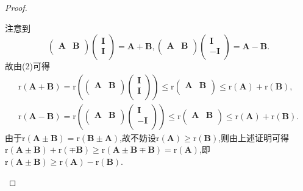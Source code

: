 \documentclass[../../main.tex]{subfiles}%
\begin{document}
\begin{proof}
\begin{enumerate}[(1)]
注意到
\[
\left( \begin{matrix}
\boldsymbol{A}&		\boldsymbol{B}\\
\end{matrix} \right) \left( \begin{array}{c}
\boldsymbol{I}\\
\boldsymbol{I}\\
\end{array} \right) =\boldsymbol{A}+\boldsymbol{B},\left( \begin{matrix}
\boldsymbol{A}&		\boldsymbol{B}\\
\end{matrix} \right) \left( \begin{array}{c}
\boldsymbol{I}\\
-\boldsymbol{I}\\
\end{array} \right) =\boldsymbol{A}-\boldsymbol{B}.
\]
故由(2)可得
\begin{align*}
\mathrm{r}\left( \boldsymbol{A}+\boldsymbol{B} \right) =\mathrm{r}\left( \left( \begin{matrix}
\boldsymbol{A}&		\boldsymbol{B}\\
\end{matrix} \right) \left( \begin{array}{c}
\boldsymbol{I}\\
\boldsymbol{I}\\
\end{array} \right) \right) \leqslant \mathrm{r}\left( \begin{matrix}
\boldsymbol{A}&		\boldsymbol{B}\\
\end{matrix} \right) \leqslant \mathrm{r}\left( \boldsymbol{A} \right) +\mathrm{r}\left( \boldsymbol{B} \right) ,
\\
\mathrm{r}\left( \boldsymbol{A}-\boldsymbol{B} \right) =\mathrm{r}\left( \left( \begin{matrix}
\boldsymbol{A}&		\boldsymbol{B}\\
\end{matrix} \right) \left( \begin{array}{c}
\boldsymbol{I}\\
-\boldsymbol{I}\\
\end{array} \right) \right) \leqslant \mathrm{r}\left( \begin{matrix}
\boldsymbol{A}&		\boldsymbol{B}\\
\end{matrix} \right) \leqslant \mathrm{r}\left( \boldsymbol{A} \right) +\mathrm{r}\left( \boldsymbol{B} \right) .
\end{align*}
由于\(\mathrm{r}(\boldsymbol{A}\pm \boldsymbol{B})=\mathrm{r}(\boldsymbol{B}\pm \boldsymbol{A})\),故不妨设\(\mathrm{r}(\boldsymbol{A})\geqslant \mathrm{r}(\boldsymbol{B})\),则由上述证明可得\(\mathrm{r}(\boldsymbol{A}\pm \boldsymbol{B})+\mathrm{r}(\mp \boldsymbol{B})\geqslant \mathrm{r}(\boldsymbol{A}\pm\boldsymbol{B}\mp \boldsymbol{B})=\mathrm{r}(\boldsymbol{A})\),即\(\mathrm{r}(\boldsymbol{A}\pm \boldsymbol{B})\geqslant \mathrm{r}(\boldsymbol{A})-\mathrm{r}(\boldsymbol{B})\).


\end{enumerate}
\end{proof}
\end{document}
